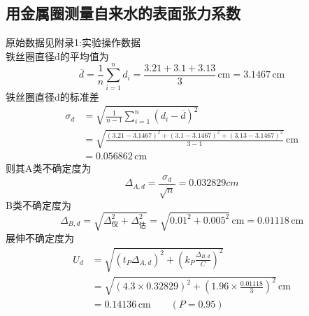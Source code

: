 \documentclass[12pt,a4paper,oneside]{ctexart}
\begin{document}
\subsection{用金属圈测量自来水的表面张力系数}
\noindent
原始数据见附录1:实验操作数据\\
铁丝圈直径d的平均值为
$$
\overline{d}=\frac{1}{n}\sum_{i=1}^{n}d_i=\frac{3.21+3.1+3.13}{3}\,\mathrm{cm}=3.1467\,\mathrm{cm}
$$
铁丝圈直径d的标准差
$$
\begin{aligned}
\sigma_{d}&=\sqrt{\frac{1}{n-1}\sum_{i=1}^n\left(d_i-\overline{d}\right)^2}\\
&=\sqrt{\frac{(3.21-3.1467)^2+(3.1-3.1467)^2+(3.13-3.1467)^2}{3-1}}\,\mathrm{cm}\\
&=0.056862\,\mathrm{cm}
\end{aligned}
$$
则其A类不确定度为
$$\Delta_{A,d}=\dfrac{\sigma_{d}}{\sqrt{n}}=0.032829cm$$
B类不确定度为
$$
\Delta_{B,d}=\sqrt{\Delta_\text{仪}^2+\Delta_\text{估}^2}=\sqrt{0.01^2+0.005^2}\,\mathrm{cm}=0.01118\,\mathrm{cm}
$$
展伸不确定度为
$$
\begin{aligned}
U_d&=\sqrt{\left(t_P\Delta_{A,d}\right)^2+\left(k_P\frac{\Delta_{B,d}}{C}\right)^2}\\
&=\sqrt{\left(4.3\times0.32829\right)^2+\left(1.96\times\frac{0.01118}{3}\right)^2}\,\mathrm{cm}\\
&=0.14136\,\mathrm{cm} \qquad (P=0.95)
\end{aligned}
$$
\end{document}
